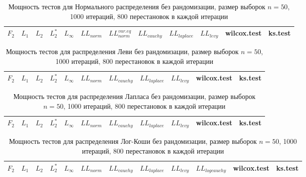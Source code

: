 \documentclass{report}
\begin{document}
\begin{longtable}{|c|c|c|c|c|c|c|c|c|c|c|c|}
  \caption{Мощность тестов для Нормального распределения без рандомизации, размер выборок $n=50$, 1000 итераций, 800 перестановок в каждой итерации} \\
  \hline
  $F_2$ & $L_{1}$ & $L_{2}$ & $L_2^*$ & $L_{\infty}$ & $LL_{norm}$ & $LL_{norm}^{var.eq}$ & $LL_{cauchy}$ & $LL_{laplace}$ & $LL_{levy}$ & wilcox.test & ks.test \\ \hline
  
\end{longtable}

\begin{longtable}{|c|c|c|c|c|c|c|c|c|c|c|}
  \caption{Мощность тестов для распределения Леви без рандомизации, размер выборок $n=50$, 1000 итераций, 800 перестановок в каждой итерации} \\
  \hline
  $F_2$ & $L_{1}$ & $L_{2}$ & $L_2^*$ & $L_{\infty}$ & $LL_{norm}$ & $LL_{cauchy}$ & $LL_{laplace}$ & $LL_{levy}$ & wilcox.test & ks.test \\ \hline
  
\end{longtable}

\begin{longtable}{|c|c|c|c|c|c|c|c|c|c|c|}
  \caption{Мощность тестов для распределения Лапласа без рандомизации, размер выборок $n=50$, 1000 итераций, 800 перестановок в каждой итерации} \\
  \hline
  $F_2$ & $L_{1}$ & $L_{2}$ & $L_2^*$ & $L_{\infty}$ & $LL_{norm}$ & $LL_{cauchy}$ & $LL_{laplace}$ & $LL_{levy}$ & wilcox.test & ks.test \\ \hline
  
\end{longtable}

\begin{longtable}{|c|c|c|c|c|c|c|c|c|c|c|c|}
  \caption{Мощность тестов для распределения Лог-Коши без рандомизации, размер выборок $n=50$, 1000 итераций, 800 перестановок в каждой итерации} \\
  \hline
  $F_2$ & $L_{1}$ & $L_{2}$ & $L_2^*$ & $L_{\infty}$ & $LL_{norm}$ & $LL_{cauchy}$ & $LL_{laplace}$ & $LL_{levy}$ & $LL_{logcauchy}$ & wilcox.test & ks.test \\ \hline
  
\end{longtable}
\end{document}
